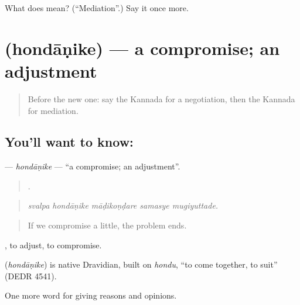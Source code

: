 \begin{tcolorbox}[breakable,colback=teal!4,colframe=teal!35!black,title={Before you move on}]
What does  mean? (\textquotedblleft{}Mediation\textquotedblright{}.) Say it once more.
\end{tcolorbox}
\section[\texorpdfstring{\kn{ಹೊಂದಾಣಿಕೆ} (hondāṇike)}{ಹೊಂದಾಣಿಕೆ (hondāṇike)}]{ (hondāṇike) — a compromise; an adjustment}

\label{lesson:KA-C405-hondanike}



\begin{quote}
Before the new one: say the Kannada for a negotiation, then the Kannada for mediation.
\end{quote}

\subsection*{You'll want to know: }
\textbf{} — \emph{hondāṇike} — \textquotedblleft{}a compromise; an adjustment\textquotedblright{}.

\begin{quote}
    .
\end{quote}

\begin{quote}
\emph{svalpa hondāṇike māḍikoṇḍare samasye mugiyuttade.}
\end{quote}

\begin{quote}
If we compromise a little, the problem ends.
\end{quote}

 , to adjust, to compromise.

\begin{cousinweb}
\textbf{} (\emph{hondāṇike}) is native Dravidian, built on \emph{hondu}, \textquotedblleft{}to come together, to suit\textquotedblright{} (DEDR 4541).
\end{cousinweb}

\begin{grammarlens}[title={What you've built}]
One more word for giving reasons and opinions.
\end{grammarlens}

